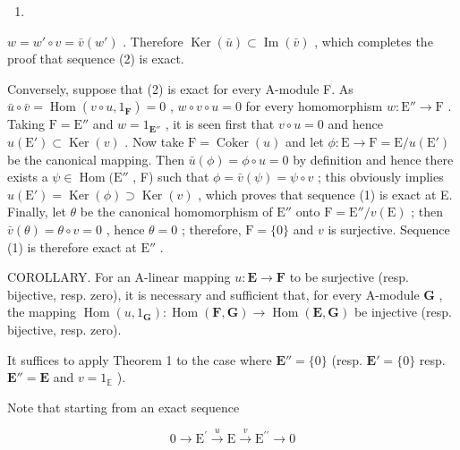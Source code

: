 \begin{enumerate}
\def\labelenumi{(\arabic{enumi})}
\setcounter{enumi}{3}
\tightlist
\item
\end{enumerate}

\(w = w' \circ v = \bar{v}(w')\) . Therefore \(\operatorname{Ker}(\bar{u}) \subset \operatorname{Im}(\bar{v})\) , which completes the proof that sequence (2) is exact.

Conversely, suppose that (2) is exact for every A-module F. As \(\bar{u} \circ \bar{v} = \operatorname{Hom}(v \circ u, 1_{\mathbf{F}}) = 0\) , \(w \circ v \circ u = 0\) for every homomorphism \(w: \mathrm{E}'' \to \mathrm{F}\) . Taking \(\mathrm{F} = \mathrm{E}''\) and \(w = 1_{\mathbf{E}''}\) , it is seen first that \(v \circ u = 0\) and hence \(u(\mathrm{E}') \subset \operatorname{Ker}(v)\) . Now take \(\mathrm{F} = \operatorname{Coker}(u)\) and let \(\phi: \mathrm{E} \to \mathrm{F} = \mathrm{E}/u(\mathrm{E}')\) be the canonical mapping. Then \(\bar{u}(\phi) = \phi \circ u = 0\) by definition and hence there exists a \(\psi \in \operatorname{Hom}(\mathrm{E}''\) , F) such that \(\phi = \bar{v}(\psi) = \psi \circ v\) ; this obviously implies \(u(\mathrm{E}') = \operatorname{Ker}(\phi) \supset \operatorname{Ker}(v)\) , which proves that sequence (1) is exact at E. Finally, let \(\theta\) be the canonical homomorphism of \(\mathrm{E}''\) onto \(\mathrm{F} = \mathrm{E}''/v(\mathrm{E})\) ; then \(\bar{v}(\theta) = \theta \circ v = 0\) , hence \(\theta = 0\) ; therefore, \(\mathrm{F} = \{0\}\) and \(v\) is surjective. Sequence (1) is therefore exact at \(\mathrm{E}''\) .

COROLLARY. For an A-linear mapping \(u: \mathbf{E} \to \mathbf{F}\) to be surjective (resp. bijective, resp. zero), it is necessary and sufficient that, for every A-module \(\mathbf{G}\) , the mapping \(\operatorname{Hom}(u, 1_{\mathbf{G}}): \operatorname{Hom}(\mathbf{F}, \mathbf{G}) \to \operatorname{Hom}(\mathbf{E}, \mathbf{G})\) be injective (resp. bijective, resp. zero).

It suffices to apply Theorem 1 to the case where \(\mathbf{E}'' = \{0\}\) (resp. \(\mathbf{E}' = \{0\}\) resp. \(\mathbf{E}'' = \mathbf{E}\) and \(v = 1_{\mathbb{E}}\) ).

Note that starting from an exact sequence

\[
0 \longrightarrow \mathrm{E} ^ {\prime} \stackrel {u} {\longrightarrow} \mathrm{E} \stackrel {v} {\longrightarrow} \mathrm{E} ^ {\prime \prime} \longrightarrow 0
\]

